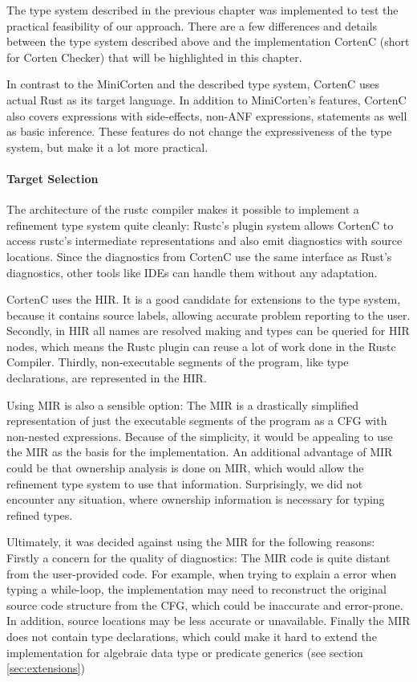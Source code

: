 \documentclass[twoside, english]{sdqthesis}
\theoremstyle{definition}
\begin{document}
The type system described in the previous chapter was implemented to test the practical feasibility of our approach.
There are a few differences and details between the type system described above and the implementation CortenC (short for Corten Checker) that will be highlighted in this chapter.

In contrast to the MiniCorten and the described type system, CortenC uses actual Rust as its target language. In addition to MiniCorten's features, CortenC also covers expressions with side-effects, non-ANF expressions, statements as well as basic inference.
These features do not change the expressiveness of the type system, but make it a lot more practical.

\paragraph{Target Selection}
The architecture of the rustc compiler makes it possible to implement a refinement type system quite cleanly: Rustc's plugin system allows CortenC to access rustc's intermediate representations and also emit diagnostics with source locations. Since the diagnostics from CortenC use the same interface as Rust's diagnostics, other tools like IDEs can handle them without any adaptation.

CortenC uses the HIR. It is a good candidate for extensions to the type system, because it contains source labels, allowing accurate problem reporting to the user. Secondly, in HIR all names are resolved making and types can be queried for HIR nodes, which means the Rustc plugin can reuse a lot of work done in the Rustc Compiler. Thirdly, non-executable segments of the program, like type declarations, are represented in the HIR.

Using MIR is also a sensible option: The MIR is a drastically simplified representation of just the executable segments of the program as a CFG with non-nested expressions. Because of the simplicity, it would be appealing to use the MIR as the basis for the implementation. 
An additional advantage of MIR could be that ownership analysis is done on MIR, which would allow the refinement type system to use that information. Surprisingly, we did not encounter any situation, where ownership information is necessary for typing refined types.

Ultimately, it was decided against using the MIR for the following reasons:
Firstly a concern for the quality of diagnostics: The MIR code is quite distant from the user-provided code. For example, when trying to explain a error when typing a while-loop, the implementation may need to reconstruct the original source code structure from the CFG, which could be inaccurate and error-prone. 
In addition, source locations may be less accurate or unavailable. 
Finally the MIR does not contain type declarations, which could make it hard to extend the implementation for algebraic data type or predicate generics (see section \ref{sec:extensions})
\end{document}
